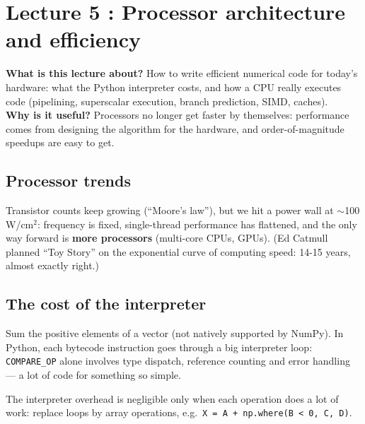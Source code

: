 \documentclass[11pt,a4paper,openany]{book}
\begin{document}
\chapter{Lecture 5 : Processor architecture and efficiency}

\begin{rembox}[title=In a nutshell]
\textbf{What is this lecture about?} How to write efficient numerical code for today's hardware:
what the Python interpreter costs, and how a CPU really executes code (pipelining, superscalar
execution, branch prediction, SIMD, caches). \\
\textbf{Why is it useful?} Processors no longer get faster by themselves: performance comes from
designing the algorithm for the hardware, and order-of-magnitude speedups are easy to get.
\end{rembox}

\section{Processor trends}

\begin{propbox}[title=The power wall]
Transistor counts keep growing (``Moore's law''), but we hit a power wall at
$\sim$100 W/cm$^2$: frequency is fixed, single-thread performance has flattened, and the only
way forward is \textbf{more processors} (multi-core CPUs, GPUs). (Ed Catmull planned ``Toy
Story'' on the exponential curve of computing speed: 14-15 years, almost exactly right.)
\end{propbox}


\section{The cost of the interpreter}

\begin{exbox}[title=Model problem: psum]
Sum the positive elements of a vector (not natively supported by NumPy). In Python, each
bytecode instruction goes through a big interpreter loop: \texttt{COMPARE\_OP} alone involves
type dispatch, reference counting and error handling --- a lot of code for something so simple.
\end{exbox}

\begin{keybox}[title=Vectorize in Python]
The interpreter overhead is negligible only when each operation does a lot of work: replace
loops by array operations, e.g.\ \texttt{X = A + np.where(B < 0, C, D)}.
\end{keybox}
\end{document}
